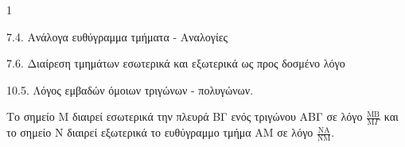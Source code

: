 \begin{ylh}{1}
    \item 7.4. Ανάλογα ευθύγραμμα τμήματα - Αναλογίες
    \item 7.6. Διαίρεση τμημάτων εσωτερικά και εξωτερικά ως προς δοσμένο λόγο
    \item 10.5. Λόγος εμβαδών όμοιων τριγώνων - πολυγώνων.
\end{ylh}
\begin{figure} %
\end{figure}
Το σημείο M διαιρεί εσωτερικά την πλευρά ΒΓ ενός τριγώνου ΑΒΓ σε λόγο $\frac{\text{MB}}{\text{M}\Gamma}$ και το σημείο N διαιρεί εξωτερικά το ευθύγραμμο τμήμα ΑΜ σε λόγο $\frac{\text{NA}}{\text{NM}}$.

